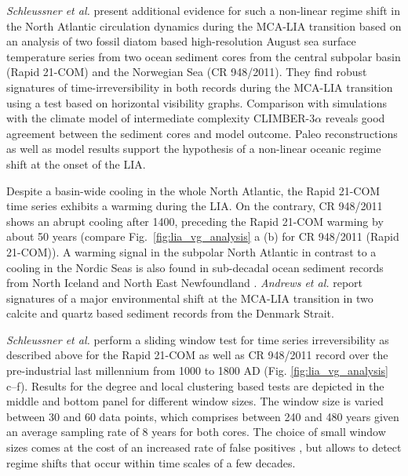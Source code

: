 		\textit{Schleussner et al.} \cite{schleussner2015indications} present additional evidence for such a non-linear regime shift in the North Atlantic circulation dynamics during the MCA-LIA transition based on an analysis of two fossil diatom based high-resolution August sea surface temperature series from two ocean sediment cores from the central subpolar basin (Rapid 21-COM) and the Norwegian Sea (CR 948/2011). They find robust signatures of time-irreversibility in both records during the MCA-LIA transition using a test based on horizontal visibility graphs. Comparison with simulations with the climate model of intermediate complexity CLIMBER-3$\alpha$ reveals good agreement between the sediment cores and model outcome. Paleo reconstructions as well as model results support the hypothesis of a non-linear oceanic regime shift at the onset of the LIA.

		Despite a basin-wide cooling in the whole North Atlantic, the Rapid 21-COM time series exhibits a warming during the LIA. On the contrary, CR 948/2011 shows an abrupt cooling after 1400, preceding the Rapid 21-COM warming by about 50 years (compare Fig.~\ref{fig:lia_vg_analysis} a (b) for CR 948/2011 (Rapid 21-COM)). A warming signal in the subpolar North Atlantic in contrast to a cooling in the Nordic Seas is also found in sub-decadal ocean sediment records from North Iceland and North East Newfoundland \cite{sicre_wekstroem14}. \textit{Andrews et al.}\cite{andrews_jennings14} report signatures of a major environmental shift at the MCA-LIA transition in two calcite and quartz based sediment records from the Denmark Strait.

		\textit{Schleussner et al.} perform a sliding window test for time series irreversibility as described above for the Rapid 21-COM as well as CR 948/2011 record over the pre-industrial last millennium from 1000 to 1800 AD (Fig. \ref{fig:lia_vg_analysis} c--f). Results for the degree and local clustering based tests are depicted in the middle and bottom panel for different window sizes. The window size is varied between 30 and 60 data points, which comprises between 240 and 480 years given an average sampling rate of 8 years for both cores. The choice of small window sizes comes at the cost of an increased rate of false positives \cite{Donges2013}, but allows to detect regime shifts that occur within time scales of a few decades.

